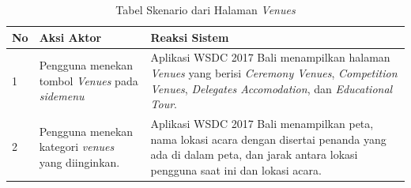\begin{enumerate}
		 \begin{table}[H]
			\centering
			\begin{tabular}{|p{0.5cm}|p{7cm}|p{7cm}|}
				\hline
				No & Aksi Aktor                               & Reaksi Sistem                                          \\ \hline
				1  & Pengguna menekan tombol \textit{Venues} pada \textit{sidemenu} & Aplikasi WSDC 2017 Bali menampilkan halaman \textit{Venues} yang berisi {\it Ceremony Venues}, {\it Competition Venues}, {\it Delegates Accomodation}, dan {\it Educational Tour}.\\ \hline
				2  & Pengguna menekan kategori {\it venues} yang diinginkan. & Aplikasi WSDC 2017 Bali menampilkan peta, nama lokasi acara dengan disertai penanda yang ada di dalam peta, dan jarak antara lokasi pengguna saat ini dan lokasi acara.\\ \hline
			\end{tabular}
			\caption{Tabel Skenario dari Halaman {\it Venues}}
			\label{table:skenarioHalamanVenues}
		\end{table}


\end{enumerate}
